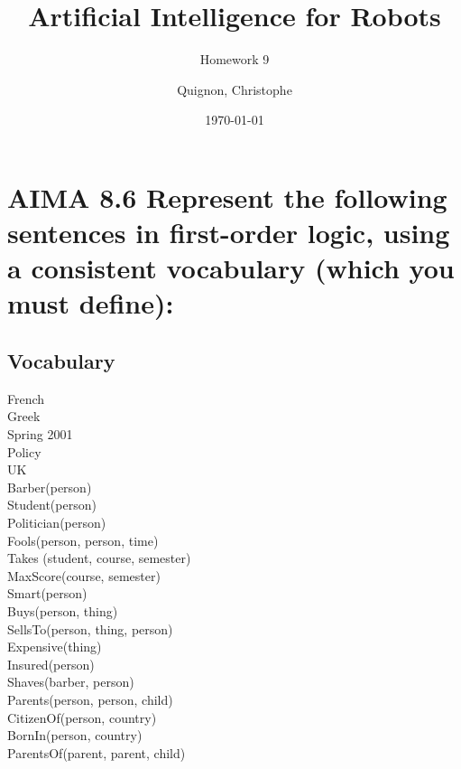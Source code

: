 \documentclass{scrartcl}
\begin{document}
\title{Artificial Intelligence for Robots}
\subtitle{Homework 9}
\author{
  Quignon, Christophe \\
} 
\date{\today}

\maketitle{}
\section{AIMA 8.6 Represent the following sentences in first-order logic, using a consistent vocabulary (which you must define):}

\subsection{Vocabulary}
French\\
Greek\\
Spring 2001\\
Policy\\
UK\\
Barber(person)\\
Student(person)\\
Politician(person)\\
Fools(person, person, time)\\
Takes (student, course, semester)\\
MaxScore(course, semester)\\
Smart(person)\\
Buys(person, thing)\\
SellsTo(person, thing, person)\\
Expensive(thing)\\
Insured(person)\\
Shaves(barber, person)\\
Parents(person, person, child)\\
CitizenOf(person, country)\\
BornIn(person, country)\\
ParentsOf(parent, parent, child)\\
\end{document}
